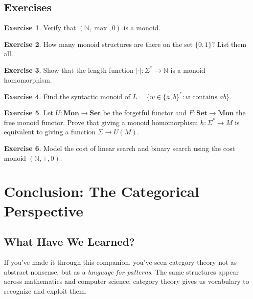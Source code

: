 \documentclass[11pt]{article}
\newcommand{\N}{\mathbb{N}}
\newcommand{\cat}[1]{\mathbf{#1}}
\newcommand{\Set}{\cat{Set}}
\theoremstyle{definition}
\newtheorem{exercise}{Exercise}[section]
\theoremstyle{plain}
\theoremstyle{remark}
\begin{document}
\subsection{Exercises}

\begin{exercise}
Verify that $(\N, \max, 0)$ is a monoid.
\end{exercise}

\begin{exercise}
How many monoid structures are there on the set $\{0, 1\}$? List them all.
\end{exercise}

\begin{exercise}
Show that the length function $|\cdot|: \Sigma^* \to \N$ is a monoid homomorphism.
\end{exercise}

\begin{exercise}
Find the syntactic monoid of $L = \{w \in \{a,b\}^* : w \text{ contains } ab\}$.
\end{exercise}

\begin{exercise}
Let $U: \cat{Mon} \to \Set$ be the forgetful functor and $F: \Set \to \cat{Mon}$ the free monoid functor. Prove that giving a monoid homomorphism $h: \Sigma^* \to M$ is equivalent to giving a function $\Sigma \to U(M)$.
\end{exercise}

\begin{exercise}
Model the cost of linear search and binary search using the cost monoid $(\N, +, 0)$.
\end{exercise}

\section{Conclusion: The Categorical Perspective}

\subsection{What Have We Learned?}

If you've made it through this companion, you've seen category theory not as abstract nonsense, but as a \emph{language for patterns}. The same structures appear across mathematics and computer science; category theory gives us vocabulary to recognize and exploit them.
\end{document}
